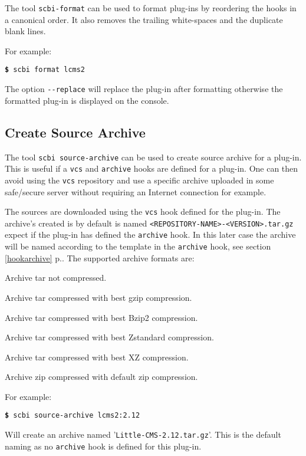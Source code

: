 \documentclass[a4paper,12pt,twoside]{article}
\newcommand{\code}[1]{\texttt{#1}}
\newcommand{\seeref}[1]{see section \ref{#1} p.\pageref{#1}}
\newcommand{\file}[1]{'{\texttt{#1}}'}
\newcommand{\cmd}[1]{\tabto{1cm}\hspace{0.5cm}\texttt{\textbf{\$} #1}}
\newcommand{\ddash}{-{}-}
\begin{document}
The tool \code{scbi-format} can be used to format plug-ins by reordering the hooks in a canonical order. It also removes the trailing white-spaces and the duplicate blank lines.

For example:

\cmd{scbi format lcms2}

The option \code{\ddash{}replace} will replace the plug-in after formatting otherwise the formatted plug-in is displayed on the console.

\subsection{Create Source Archive}
\label{createsourcearchive}

The tool \code{scbi source-archive} can be used to create source archive for a plug-in. This is useful if a \code{vcs} and \code{archive} hooks are defined for a plug-in. One can then avoid using the \code{vcs} repository and use a specific archive uploaded in some safe/secure server without requiring an Internet connection for example.

The sources are downloaded using the \code{vcs} hook defined for the plug-in. The archive's created is by default is named \code{<REPOSITORY-NAME>-<VERSION>.tar.gz} expect if the plug-in has defined the \code{archive} hook. In this later case the archive will be named according to the template in the \code{archive} hook, \seeref{hookarchive}. The supported archive formats are:

\begin{description}[style=nextline]
	\item[.tar] Archive tar not compressed.
	\item[.tar.gz] Archive tar compressed with best gzip compression.
	\item[.tar.bz2] Archive tar compressed with best Bzip2 compression.
	\item[.tar.zst] Archive tar compressed with best Zstandard compression.
	\item[.tar.xz] Archive tar compressed with best XZ compression.
	\item[.zip] Archive zip compressed with default zip compression.
\end{description}

For example:

\cmd{scbi source-archive lcms2:2.12}

Will create an archive named \file{Little-CMS-2.12.tar.gz}. This is the default naming as no \code{archive} hook is defined for this plug-in.
\end{document}
